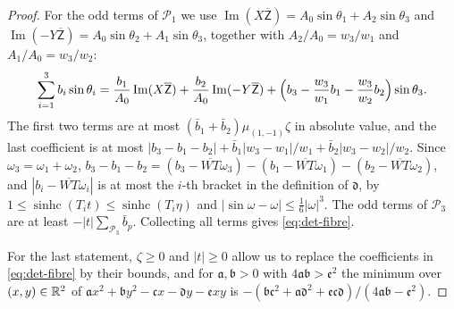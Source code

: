 \begin{proof}
For the odd terms of $\mathcal P_1$ we use $\operatorname{Im}(X\overline{\mathsf Z})=A_0\sin\theta_1+A_2\sin\theta_3$ and
$\operatorname{Im}(-Y\overline{\mathsf Z})=A_0\sin\theta_2+A_1\sin\theta_3$, together with $A_2/A_0=w_3/w_1$ and $A_1/A_0=w_3/w_2$:
\[
  \sum_{i=1}^3b_i\sin\theta_i=\frac{b_1}{A_0}\operatorname{Im}(X\overline{\mathsf Z})+\frac{b_2}{A_0}\operatorname{Im}(-Y\overline{\mathsf Z})
     +\Bigl(b_3-\frac{w_3}{w_1}b_1-\frac{w_3}{w_2}b_2\Bigr)\sin\theta_3 .
\]
The first two terms are at most $(\bar b_1+\bar b_2)\mu_{(1,-1)}\zeta$ in absolute value, and the last coefficient is at most
$|b_3-b_1-b_2|+\bar b_1|w_3-w_1|/w_1+\bar b_2|w_3-w_2|/w_2$. Since $\omega_3=\omega_1+\omega_2$,
$b_3-b_1-b_2=(b_3-\overline{WT}\omega_3)-(b_1-\overline{WT}\omega_1)-(b_2-\overline{WT}\omega_2)$, and
$|b_i-\overline{WT}\omega_i|$ is at most the $i$-th bracket in the definition of $\mathfrak d$, by
$1\le\operatorname{sinhc}(T_it)\le\operatorname{sinhc}(T_i\eta)$ and $|\sin\omega-\omega|\le\frac16|\omega|^3$. The odd terms of
$\mathcal P_3$ are at least $-|t|\sum_{\mathcal P_3}\bar b_p$. Collecting all terms gives \eqref{eq:det-fibre}.

For the last statement, $\zeta\ge0$ and $|t|\ge0$ allow us to replace the coefficients in \eqref{eq:det-fibre} by their bounds,
and for $\mathfrak a,\mathfrak b>0$ with $4\mathfrak a\mathfrak b>\mathfrak e^2$ the minimum over $(x,y)\in\mathbb R^2$ of
$\mathfrak a x^2+\mathfrak b y^2-\mathfrak c x-\mathfrak d y-\mathfrak e xy$ is
$-(\mathfrak b\mathfrak c^2+\mathfrak a\mathfrak d^2+\mathfrak e\mathfrak c\mathfrak d)/(4\mathfrak a\mathfrak b-\mathfrak e^2)$.
\end{proof}

